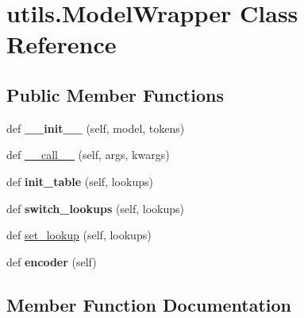 \hypertarget{classutils_1_1ModelWrapper}{}\section{utils.\+Model\+Wrapper Class Reference}
\label{classutils_1_1ModelWrapper}
\subsection*{Public Member Functions}
\begin{DoxyCompactItemize}
\item 
def {\bfseries \+\_\+\+\_\+init\+\_\+\+\_\+} (self, model, tokens)\hypertarget{classutils_1_1ModelWrapper_acc9526c703bb713b2b5498c11ed58b9f}{}\label{classutils_1_1ModelWrapper_acc9526c703bb713b2b5498c11ed58b9f}

\item 
def \hyperlink{classutils_1_1ModelWrapper_a66a672f97f19bbd9a0e37d0fc7aff29b}{\+\_\+\+\_\+call\+\_\+\+\_\+} (self, args, kwargs)
\item 
def {\bfseries init\+\_\+table} (self, lookups)\hypertarget{classutils_1_1ModelWrapper_a1a78994add85b8b95d95a56b5e0547ae}{}\label{classutils_1_1ModelWrapper_a1a78994add85b8b95d95a56b5e0547ae}

\item 
def {\bfseries switch\+\_\+lookups} (self, lookups)\hypertarget{classutils_1_1ModelWrapper_a594f4d5a1251fe417e648e267d29d096}{}\label{classutils_1_1ModelWrapper_a594f4d5a1251fe417e648e267d29d096}

\item 
def \hyperlink{classutils_1_1ModelWrapper_a753e0e038dcd5691189f885cfb5b859d}{set\+\_\+lookup} (self, lookups)
\item 
def {\bfseries encoder} (self)\hypertarget{classutils_1_1ModelWrapper_a93d7be08532ab533cb74b2e56066d0ec}{}\label{classutils_1_1ModelWrapper_a93d7be08532ab533cb74b2e56066d0ec}

\end{DoxyCompactItemize}


\subsection{Member Function Documentation}
